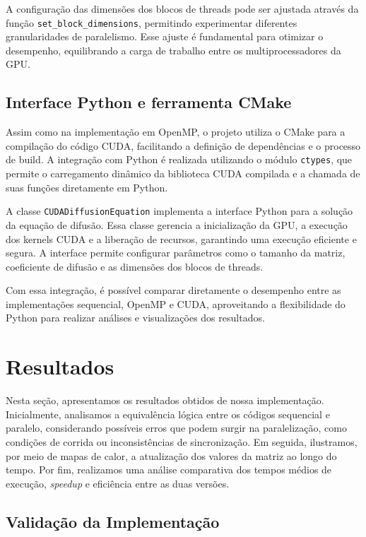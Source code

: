 \documentclass[12pt]{article}
\begin{document}
A configuração das dimensões dos blocos de threads pode ser ajustada através da
função \texttt{set\_block\_dimensions}, permitindo experimentar diferentes
granularidades de paralelismo. Esse ajuste é fundamental para otimizar o
desempenho, equilibrando a carga de trabalho entre os multiprocessadores da
GPU.

\subsection{Interface Python e ferramenta CMake}

Assim como na implementação em OpenMP, o projeto utiliza o CMake para a
compilação do código CUDA, facilitando a definição de dependências e o processo
de build. A integração com Python é realizada utilizando o módulo
\texttt{ctypes}, que permite o carregamento dinâmico da biblioteca CUDA
compilada e a chamada de suas funções diretamente em Python.

A classe \texttt{CUDADiffusionEquation} implementa a interface Python para a
solução da equação de difusão. Essa classe gerencia a inicialização da GPU, a
execução dos kernels CUDA e a liberação de recursos, garantindo uma execução
eficiente e segura. A interface permite configurar parâmetros como o tamanho da
matriz, coeficiente de difusão e as dimensões dos blocos de threads.

Com essa integração, é possível comparar diretamente o desempenho entre as
implementações sequencial, OpenMP e CUDA, aproveitando a flexibilidade do
Python para realizar análises e visualizações dos resultados.

\section{Resultados}

Nesta seção, apresentamos os resultados obtidos de nossa implementação.
Inicialmente, analisamos a equivalência lógica entre os códigos sequencial e
paralelo, considerando possíveis erros que podem surgir na paralelização, como
condições de corrida ou inconsistências de sincronização. Em seguida,
ilustramos, por meio de mapas de calor, a atualização dos valores da matriz ao
longo do tempo. Por fim, realizamos uma análise comparativa dos tempos médios
de execução, \textit{speedup} e eficiência entre as duas versões.

\subsection{Validação da Implementação}
\end{document}

